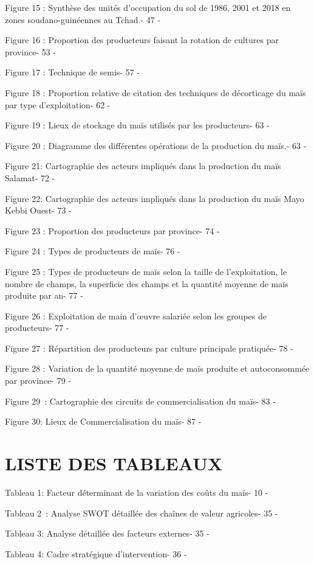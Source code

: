 \documentclass[12pt,oneside]{report}
\begin{document}
Figure 15 : Synthèse des unités d’occupation du sol de 1986, 2001 et 2018 en zones soudano-guinéennes au Tchad.- 47 -

Figure 16 : Proportion des producteurs faisant la rotation de cultures par province- 53 -

Figure 17 : Technique de semis- 57 -

Figure 18 : Proportion relative de citation des techniques de décorticage du maïs par type d’exploitation- 62 -

Figure 19 : Lieux de stockage du maïs utilisés par les producteurs- 63 -

Figure 20 : Diagramme des différentes opérations de la production du maïs.- 63 -

Figure 21: Cartographie des acteurs impliqués dans la production du maïs Salamat- 72 -

Figure 22: Cartographie des acteurs impliqués dans la production du maïs Mayo Kebbi Ouest- 73 -

Figure 23 : Proportion des producteurs par province- 74 -

Figure 24 : Types de producteurs de maïs- 76 -

Figure 25 : Types de producteurs de maïs selon la taille de l’exploitation, le nombre de champs, la superficie des champs et la quantité moyenne de maïs produite par an- 77 -

Figure 26 : Exploitation de main d’œuvre salariée selon les groupes de producteurs- 77 -

Figure 27 : Répartition des producteurs par culture principale pratiquée- 78 -

Figure 28 : Variation de la quantité moyenne de maïs produite et autoconsommée par province- 79 -

Figure 29 : Cartographie des circuits de commercialisation du maïs- 83 -

Figure 30: Lieux de Commercialisation du maïs- 87 -

\chapter{LISTE DES TABLEAUX}
Tableau 1: Facteur déterminant de la variation des coûts du maïs- 10 -

Tableau 2 : Analyse SWOT détaillée des chaînes de valeur agricoles- 35 -

Tableau 3: Analyse détaillée des facteurs externes- 35 -

Tableau 4: Cadre stratégique d'intervention- 36 -
\end{document}
